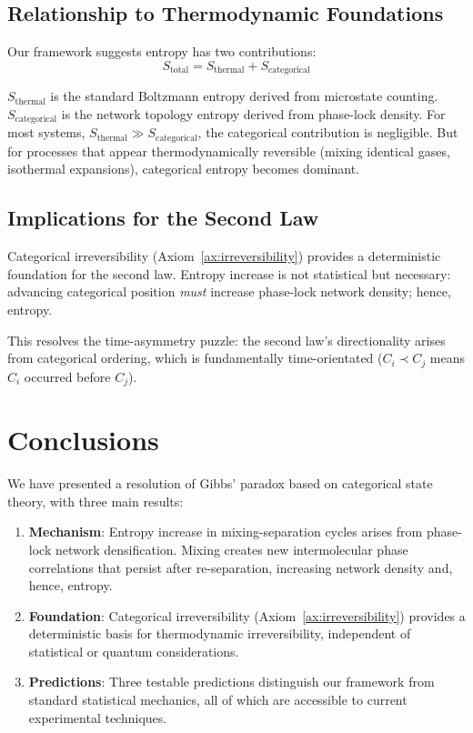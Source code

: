\documentclass[superscriptaddress,prb,10pt]{revtex4-2}
\theoremstyle{definition}
\theoremstyle{remark}
\begin{document}
\subsection{Relationship to Thermodynamic Foundations}

Our framework suggests entropy has two contributions:
\begin{equation}
S_{\text{total}} = S_{\text{thermal}} + S_{\text{categorical}}
\end{equation}

$S_{\text{thermal}}$ is the standard Boltzmann entropy derived from microstate counting. $S_{\text{categorical}}$ is the network topology entropy derived from phase-lock density. For most systems, $S_{\text{thermal}} \gg S_{\text{categorical}}$, the categorical contribution is negligible. But for processes that appear thermodynamically reversible (mixing identical gases, isothermal expansions), categorical entropy becomes dominant.

\subsection{Implications for the Second Law}

Categorical irreversibility (Axiom~\ref{ax:irreversibility}) provides a deterministic foundation for the second law. Entropy increase is not statistical but necessary: advancing categorical position \emph{must} increase phase-lock network density; hence, entropy.

This resolves the time-asymmetry puzzle: the second law's directionality arises from categorical ordering, which is fundamentally time-orientated ($C_i \prec C_j$ means $C_i$ occurred before $C_j$).

\section{Conclusions}

We have presented a resolution of Gibbs' paradox based on categorical state theory, with three main results:

\begin{enumerate}
\item \textbf{Mechanism}: Entropy increase in mixing-separation cycles arises from phase-lock network densification. Mixing creates new intermolecular phase correlations that persist after re-separation, increasing network density and, hence, entropy.

\item \textbf{Foundation}: Categorical irreversibility (Axiom~\ref{ax:irreversibility}) provides a deterministic basis for thermodynamic irreversibility, independent of statistical or quantum considerations.

\item \textbf{Predictions}: Three testable predictions distinguish our framework from standard statistical mechanics, all of which are accessible to current experimental techniques.
\end{enumerate}
\end{document}
